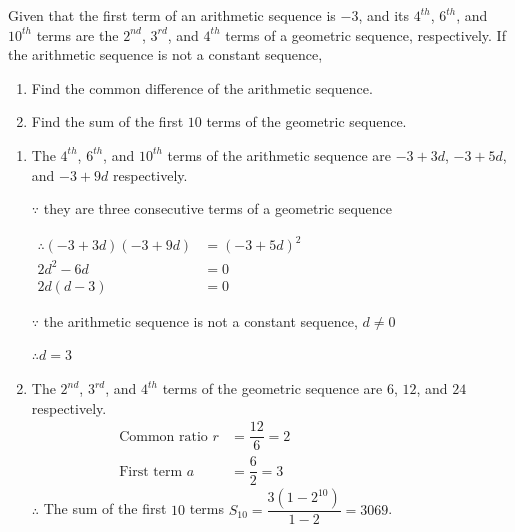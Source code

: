 \documentclass{report}
\begin{document}
        \begin{question}
            Given that the first term of an arithmetic sequence is $-3$, and its $4^{th}$, $6^{th}$, and $10^{th}$ terms are the $2^{nd}$, $3^{rd}$, and $4^{th}$ terms of a geometric sequence, respectively. If the arithmetic sequence is not a constant sequence,
            \vspace{-1em}
            \begin{enumerate}[label=(\alph*)]
                \item Find the common difference of the arithmetic sequence.

                \item Find the sum of the first $10$ terms of the geometric sequence.
            \end{enumerate}

            \sol{}

            \begin{enumerate}[label=(\alph*)]
                \item The $4^{th}$, $6^{th}$, and $10^{th}$ terms of the arithmetic sequence are $-3+3d$, $-3+5d$, and $-3+9d$ respectively.

                $\because$ they are three consecutive terms of a geometric sequence
    
                $\begin{aligned}
                    \therefore(-3+3 d)(-3+9 d) & =(-3+5 d)^2 \\
                    2 d^2-6 d & =0 \\
                    2 d(d-3) & =0
                    \end{aligned}$
    
                    $\because$ the arithmetic sequence is not a constant sequence, $d \neq 0$
    
                    $\therefore d=3$

                    \item The $2^{nd}$, $3^{rd}$, and $4^{th}$ terms of the geometric sequence are $6$, $12$, and $24$ respectively.
                    \begin{align*}
                        \text{Common ratio } r &= \dfrac{12}{6} = 2 &&&&&&&&&&&& \\
                        \text{First term } a &= \dfrac{6}{2} = 3
                    \end{align*}
                    $\therefore$ The sum of the first $10$ terms $S_10 = \dfrac{3(1-2^{10})}{1-2} = 3069$.
            \end{enumerate}
        \end{question}
\end{document}
